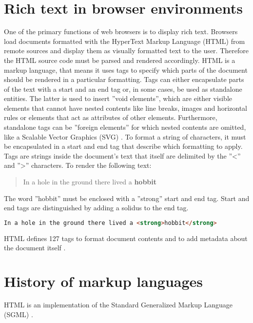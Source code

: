\section{Rich text in browser environments}

One of the primary functions of web browsers is to display rich text. Browsers load documents formatted with the HyperText Markup Language (HTML) from remote sources and display them as visually formatted text to the user. Therefore the HTML source code must be parsed and rendered accordingly. HTML is a markup language, that means it uses tags to specify which parts of the document should be rendered in a particular formatting. Tags can either encapsulate parts of the text with a start and an end tag or, in some cases, be used as standalone entities. 
The latter is used to insert ''void elements'', which are either visible elements that cannot have nested contents like line breaks, images and horizontal rules or elements that act as attributes of other elements. Furthermore, standalone tags can be ''foreign elements'' for which nested contents are omitted, like a Scalable Vector Graphics (SVG) \cite[Elements]{HTML5}. 
To format a string of characters, it must be encapsulated in a start and end tag that describe which formatting to apply. Tags are strings inside the document's text that itself are delimited by the ''<'' and ''>'' characters. To render the following text: 

\begin{quotation}
In a hole in the ground there lived a \textbf{hobbit}
\end{quotation}

The word ''hobbit'' must be enclosed with a ''strong'' start and end tag. Start and end tags are distinguished by adding a solidus to the end tag.

\begin{lstlisting}[language=html, caption=Text formatted as bold with the ''strong'' tag, label=lst:div-contenteditable]
In a hole in the ground there lived a <strong>hobbit</strong>
\end{lstlisting}

HTML defines 127 tags to format document contents and to add metadata about the document itself \cite{mozel}.



\section{History of markup languages}

HTML is an implementation of the Standard Generalized Markup Language (SGML) \cite{ISO8879}.